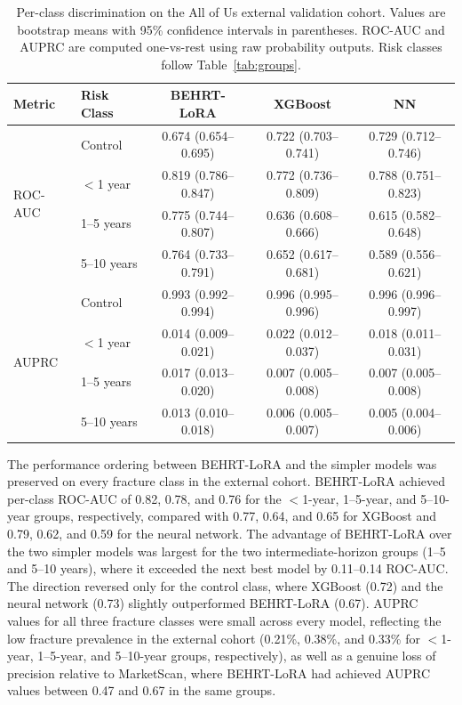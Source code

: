 \documentclass[12pt]{article}
\begin{document}
\begin{table}[H]
\centering
\caption{Per-class discrimination on the All of Us external validation cohort. Values are bootstrap means with 95\% confidence intervals in parentheses. ROC-AUC and AUPRC are computed one-vs-rest using raw probability outputs. Risk classes follow Table~\ref{tab:groups}.}
\label{tab:aou_per_class_discrimination}
\begin{tabular}{llccc}
\toprule
Metric & Risk Class & BEHRT-LoRA & XGBoost & NN \\
\midrule
\multirow{4}{*}{ROC-AUC}
 & Control     & 0.674 (0.654--0.695) & 0.722 (0.703--0.741) & 0.729 (0.712--0.746) \\
 & $<$1 year   & 0.819 (0.786--0.847) & 0.772 (0.736--0.809) & 0.788 (0.751--0.823) \\
 & 1--5 years  & 0.775 (0.744--0.807) & 0.636 (0.608--0.666) & 0.615 (0.582--0.648) \\
 & 5--10 years & 0.764 (0.733--0.791) & 0.652 (0.617--0.681) & 0.589 (0.556--0.621) \\
\midrule
\multirow{4}{*}{AUPRC}
 & Control     & 0.993 (0.992--0.994) & 0.996 (0.995--0.996) & 0.996 (0.996--0.997) \\
 & $<$1 year   & 0.014 (0.009--0.021) & 0.022 (0.012--0.037) & 0.018 (0.011--0.031) \\
 & 1--5 years  & 0.017 (0.013--0.020) & 0.007 (0.005--0.008) & 0.007 (0.005--0.008) \\
 & 5--10 years & 0.013 (0.010--0.018) & 0.006 (0.005--0.007) & 0.005 (0.004--0.006) \\
\bottomrule
\end{tabular}
\end{table}

The performance ordering between BEHRT-LoRA and the simpler models was preserved on every fracture class in the external cohort. BEHRT-LoRA achieved per-class ROC-AUC of 0.82, 0.78, and 0.76 for the $<$1-year, 1--5-year, and 5--10-year groups, respectively, compared with 0.77, 0.64, and 0.65 for XGBoost and 0.79, 0.62, and 0.59 for the neural network. The advantage of BEHRT-LoRA over the two simpler models was largest for the two intermediate-horizon groups (1--5 and 5--10 years), where it exceeded the next best model by 0.11--0.14 ROC-AUC. The direction reversed only for the control class, where XGBoost (0.72) and the neural network (0.73) slightly outperformed BEHRT-LoRA (0.67). AUPRC values for all three fracture classes were small across every model, reflecting the low fracture prevalence in the external cohort (0.21\%, 0.38\%, and 0.33\% for $<$1-year, 1--5-year, and 5--10-year groups, respectively), as well as a genuine loss of precision relative to MarketScan, where BEHRT-LoRA had achieved AUPRC values between 0.47 and 0.67 in the same groups.
\end{document}

